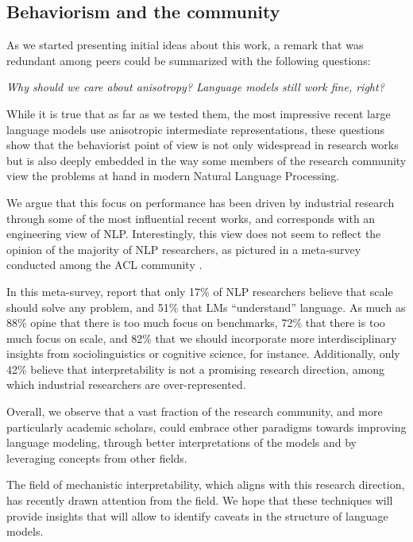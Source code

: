 \subsection{Behaviorism and the community}
As we started presenting initial ideas about this work, a remark that was redundant among peers could be summarized with the following questions:

\begin{center}
    \textit{Why should we care about anisotropy? Language models still work fine, right?}
\end{center}

While it is true that as far as we tested them, the most impressive recent large language models use anisotropic intermediate representations, these questions show that the behaviorist point of view is not only widespread in research works but is also deeply embedded in the way some members of the research community view the problems at hand in modern Natural Language Processing.

We argue that this focus on performance has been driven by industrial research through some of the most influential recent works, and corresponds with an engineering view of NLP. Interestingly, this view does not seem to reflect the opinion of the majority of NLP researchers, as pictured in a meta-survey conducted among the ACL community \citep{michael-etal-2023-nlp}.

In this meta-survey, \citet{michael-etal-2023-nlp} report that only 17\% of NLP researchers believe that scale should solve any problem, and 51\% that LMs ``understand'' language. As much as 88\% opine that there is too much focus on benchmarks, 72\% that there is too much focus on scale, and 82\% that we should incorporate more interdisciplinary insights from sociolinguistics or cognitive science, for instance. Additionally, only 42\% believe that interpretability is not a promising research direction, among which industrial researchers are over-represented.

Overall, we observe that a vast fraction of the research community, and more particularly academic scholars, could embrace other paradigms towards improving language modeling, through better interpretations of the models and by leveraging concepts from other fields.

The field of mechanistic interpretability, which aligns with this research direction, has recently drawn attention from the field. We hope that these techniques will provide insights that will allow to identify caveats in the structure of language models.

